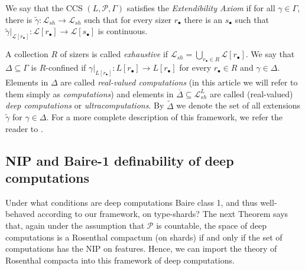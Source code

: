 \documentclass[psamsfonts]{amsart}
\theoremstyle{definition}
\theoremstyle{remark}
\numberwithin{equation}{section}
\begin{document}
We say that the CCS $(L,\mathcal P,\Gamma)$ satisfies the \emph{Extendibility Axiom} if for all $\gamma\in \Gamma$, there is $\tilde\gamma:\mathcal L_{sh}\to\mathcal L_{sh}$ such that for every sizer $r_{\bullet}$ there is an $s_\bullet$ such that $\tilde\gamma|_{\mathcal L[r_\bullet]}:\mathcal L[r_\bullet]\to\mathcal L[s_\bullet]$ is continuous.

A collection $R$ of sizers is called \emph{exhaustive} if $\mathcal{L}_{sh}=\bigcup_{r_{\bullet}\in R}\mathcal{L}[r_\bullet]$. We say that $\Delta\subseteq\Gamma$ is $R$-confined if $\gamma|_{L[r_\bullet]}:L[r_\bullet]\to L[r_\bullet]$ for every $r_\bullet\in R$ and $\gamma\in \Delta$. Elements in $\Delta$ are called \emph{real-valued computations} (in this article we will refer to them simply as \emph{computations}) and elements in $\overline{\Delta}\subseteq \mathcal L_{sh}^L$ are called (real-valued) \emph{deep computations} or \emph{ultracomputations}. By $\tilde{\Delta}$ we denote the set of all extensions $\tilde\gamma$ for $\gamma\in\Delta$. For a more complete description of this framework, we refer the reader to \cite{alva2024approximability}.

\subsection{NIP and Baire-1 definability of deep computations}

Under what conditions are deep computations Baire class 1, and thus well-behaved according to our framework, on type-shards? The next Theorem says that, again under the assumption that $\mathcal{P}$ is countable, the space of deep computations is a Rosenthal compactum (on shards) if and only if the set of computations has the NIP on features. Hence, we can import the theory of Rosenthal compacta into this framework of deep computations.
\end{document}
